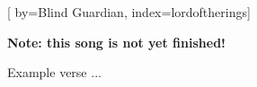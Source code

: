 

[%
    by={Blind Guardian},
    index={lordoftherings}]


    \label{lordoftherings}

    \textbf{Note: this song is not yet finished!}

    \beginverse
        Example verse ...
    \endverse
\endsong
